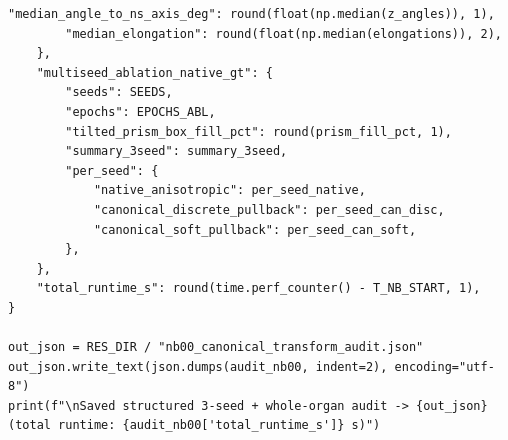 \documentclass[10pt,a4paper]{article}
\renewcommand{\_}{\origunderscore\allowbreak}
\begin{document}
\begin{codebox}
\begin{lstlisting}[style=pybmed]
        "median_angle_to_ns_axis_deg": round(float(np.median(z_angles)), 1),
        "median_elongation": round(float(np.median(elongations)), 2),
    },
    "multiseed_ablation_native_gt": {
        "seeds": SEEDS,
        "epochs": EPOCHS_ABL,
        "tilted_prism_box_fill_pct": round(prism_fill_pct, 1),
        "summary_3seed": summary_3seed,
        "per_seed": {
            "native_anisotropic": per_seed_native,
            "canonical_discrete_pullback": per_seed_can_disc,
            "canonical_soft_pullback": per_seed_can_soft,
        },
    },
    "total_runtime_s": round(time.perf_counter() - T_NB_START, 1),
}

out_json = RES_DIR / "nb00_canonical_transform_audit.json"
out_json.write_text(json.dumps(audit_nb00, indent=2), encoding="utf-8")
print(f"\nSaved structured 3-seed + whole-organ audit -> {out_json} (total runtime: {audit_nb00['total_runtime_s']} s)")
\end{lstlisting}
\end{codebox}
\end{document}
